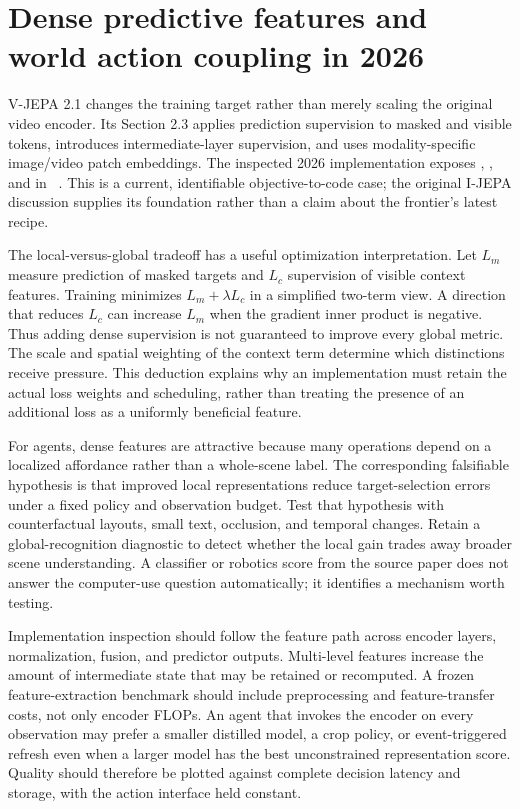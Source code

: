 \section{Dense predictive features and world action coupling in 2026}
\label{sec:C05:frontier}
V-JEPA 2.1 changes the training target rather than merely scaling the original video encoder. Its Section 2.3 applies prediction supervision to masked and visible tokens, introduces intermediate-layer supervision, and uses modality-specific image/video patch embeddings. The inspected 2026 implementation exposes , , and  in ~\cite{rewrite_vjepa21,rewrite_vjepa2_repo}. This is a current, identifiable objective-to-code case; the original I-JEPA discussion supplies its foundation rather than a claim about the frontier's latest recipe.

The local-versus-global tradeoff has a useful optimization interpretation. Let $L_m$ measure prediction of masked targets and $L_c$ supervision of visible context features. Training minimizes $L_m+\lambda L_c$ in a simplified two-term view. A direction that reduces $L_c$ can increase $L_m$ when the gradient inner product is negative. Thus adding dense supervision is not guaranteed to improve every global metric. The scale and spatial weighting of the context term determine which distinctions receive pressure. This deduction explains why an implementation must retain the actual loss weights and scheduling, rather than treating the presence of an additional loss as a uniformly beneficial feature.

For agents, dense features are attractive because many operations depend on a localized affordance rather than a whole-scene label. The corresponding falsifiable hypothesis is that improved local representations reduce target-selection errors under a fixed policy and observation budget. Test that hypothesis with counterfactual layouts, small text, occlusion, and temporal changes. Retain a global-recognition diagnostic to detect whether the local gain trades away broader scene understanding. A classifier or robotics score from the source paper does not answer the computer-use question automatically; it identifies a mechanism worth testing.

Implementation inspection should follow the feature path across encoder layers, normalization, fusion, and predictor outputs. Multi-level features increase the amount of intermediate state that may be retained or recomputed. A frozen feature-extraction benchmark should include preprocessing and feature-transfer costs, not only encoder FLOPs. An agent that invokes the encoder on every observation may prefer a smaller distilled model, a crop policy, or event-triggered refresh even when a larger model has the best unconstrained representation score. Quality should therefore be plotted against complete decision latency and storage, with the action interface held constant.


